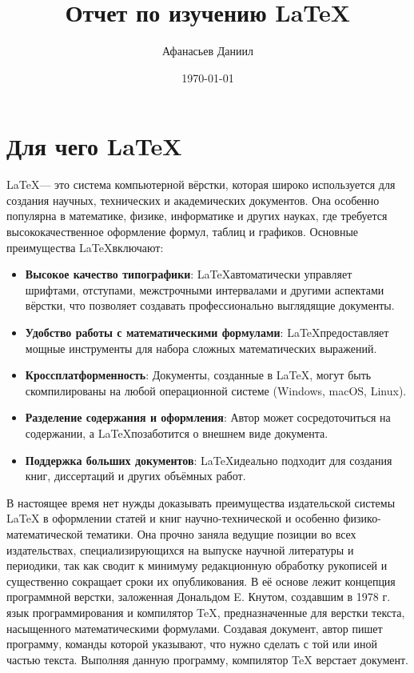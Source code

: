 \documentclass[a4paper, 14pt]{extarticle}
\newcommand{\n}{\par}
\begin{document}
	
	\title{Отчет по изучению \LaTeX{}}
	\author{Афанасьев Даниил}
	\date{\today}
		
	\maketitle
		
	\newpage
		
	\tableofcontents
		
	\newpage

		
	\section{Для чего \LaTeX}
		
	\LaTeX — это система компьютерной вёрстки, которая широко используется для создания научных, технических и академических документов. Она особенно популярна в математике, физике, информатике и других науках, где требуется высококачественное оформление формул, таблиц и графиков. Основные преимущества \LaTeX включают:
		
	\begin{itemize}
		\item \textbf{Высокое качество типографики}: \LaTeX автоматически управляет шрифтами, отступами, межстрочными интервалами и другими аспектами вёрстки, что позволяет создавать профессионально выглядящие документы.
		\item \textbf{Удобство работы с математическими формулами}: \LaTeX предоставляет мощные инструменты для набора сложных математических выражений.
		\item \textbf{Кроссплатформенность}: Документы, созданные в \LaTeX, могут быть скомпилированы на любой операционной системе (Windows, macOS, Linux).
		\item \textbf{Разделение содержания и оформления}: Автор может сосредоточиться на содержании, а \LaTeX позаботится о внешнем виде документа.
		\item \textbf{Поддержка больших документов}: \LaTeX идеально подходит для создания книг, диссертаций и других объёмных работ.
	\end{itemize}
	
	В настоящее время нет нужды доказывать преимущества издательской системы \LaTeX{} в оформлении статей и книг научно-технической и особенно физико-математической тематики. Она прочно заняла ведущие позиции во всех издательствах, специализирующихся на выпуске научной литературы и периодики, так как сводит к минимуму редакционную обработку рукописей и существенно сокращает сроки их опубликования. В её основе лежит концепция программной верстки, заложенная Дональдом E. Кнутом, создавшим в 1978 г. язык программирования и компилятор \TeX{}, предназначенные для верстки текста, насыщенного математическими формулами. Создавая документ, автор пишет программу, команды которой указывают, что нужно сделать с той или иной частью текста. Выполняя данную программу, компилятор \TeX{} верстает документ.\n
	
\end{document}
